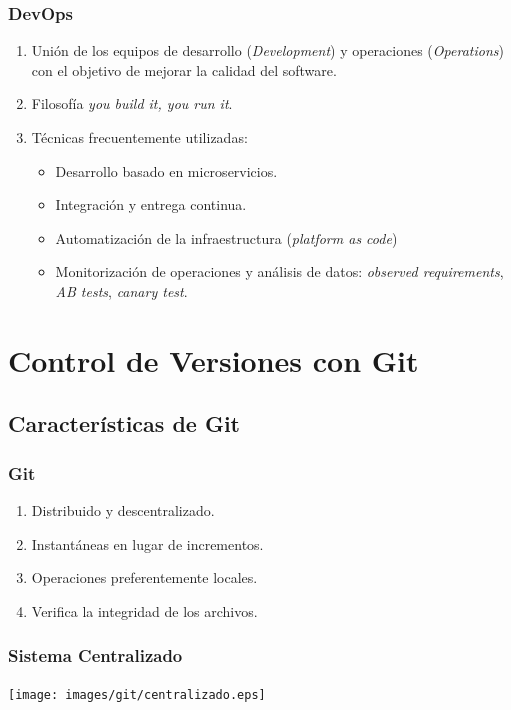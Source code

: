 \documentclass[handout,a4paper,slidestop,dvips,xcolor=pst,blue]{beamer}
\begin{document}
\begin{frame}[c]
	\frametitle{DevOps}
	\begin{enumerate}[<+->]
	   \item Unión de los equipos de desarrollo (\emph{Development}) y operaciones (\emph{Operations}) con el objetivo de mejorar la calidad del software.
       \item Filosofía \emph{you build it, you run it}.
       \item Técnicas frecuentemente utilizadas:
            \begin{itemize}
                \item Desarrollo basado en microservicios.
                \item Integración y entrega continua.
                \item Automatización de la infraestructura (\emph{platform as code})
                \item Monitorización de operaciones y análisis de datos: \emph{observed requirements}, \emph{AB tests}, \emph{canary test}.
            \end{itemize}
    \end{enumerate}	
\end{frame}

\section{Control de Versiones con Git}

\subsection{Características de Git}

\begin{frame}[c]
	\frametitle{Git}
	 \begin{enumerate}[<+->]
        \item Distribuido y descentralizado.
        \item Instantáneas en lugar de incrementos.
        \item Operaciones preferentemente locales.
        \item Verifica la integridad de los archivos.
	 \end{enumerate}
\end{frame}

\begin{frame}[c]
	\frametitle{Sistema Centralizado}
	 \begin{center}
		\texttt{[image: images/git/centralizado.eps]}
	 \end{center}
\end{frame}
\end{document}
